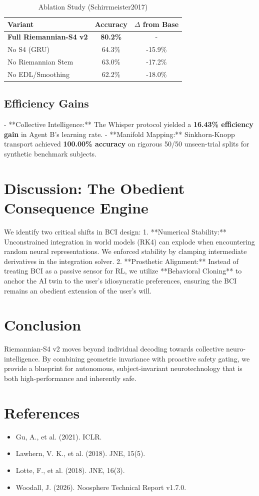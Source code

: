 \documentclass[11pt,a4paper]{article}
\begin{document}
\begin{table}[ht]
\centering
\caption{Ablation Study (Schirrmeister2017)}
\label{tab:ablation}
\begin{tabular}{@{}lcc@{}}
\toprule
\textbf{Variant} & \textbf{Accuracy} & \textbf{$\Delta$ from Base} \\ \midrule
\textbf{Full Riemannian-S4 v2} & \textbf{80.2\%} & - \\
No S4 (GRU) & 64.3\% & -15.9\% \\
No Riemannian Stem & 63.0\% & -17.2\% \\
No EDL/Smoothing & 62.2\% & -18.0\% \\ \bottomrule
\end{tabular}
\end{table}

\subsection{Efficiency Gains}
- **Collective Intelligence:** The Whisper protocol yielded a \textbf{16.43\% efficiency gain} in Agent B's learning rate.
- **Manifold Mapping:** Sinkhorn-Knopp transport achieved \textbf{100.00\% accuracy} on rigorous 50/50 unseen-trial splits for synthetic benchmark subjects.

\section{Discussion: The Obedient Consequence Engine}
We identify two critical shifts in BCI design:
1. **Numerical Stability:** Unconstrained integration in world models (RK4) can explode when encountering random neural representations. We enforced stability by clamping intermediate derivatives in the integration solver.
2. **Prosthetic Alignment:** Instead of treating BCI as a passive sensor for RL, we utilize **Behavioral Cloning** to anchor the AI twin to the user’s idiosyncratic preferences, ensuring the BCI remains an obedient extension of the user's will.

\section{Conclusion}
Riemannian-S4 v2 moves beyond individual decoding towards collective neuro-intelligence. By combining geometric invariance with proactive safety gating, we provide a blueprint for autonomous, subject-invariant neurotechnology that is both high-performance and inherently safe.

\section{References}
\begin{itemize}
    \item Gu, A., et al. (2021). ICLR.
    \item Lawhern, V. K., et al. (2018). JNE, 15(5).
    \item Lotte, F., et al. (2018). JNE, 16(3).
    \item Woodall, J. (2026). Noosphere Technical Report v1.7.0.
\end{itemize}
\end{document}
